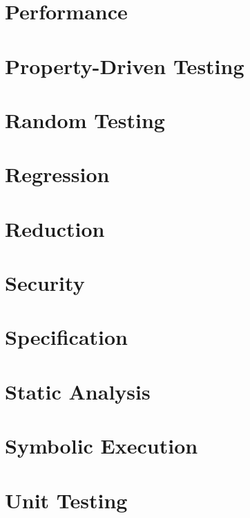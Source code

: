 \section{Performance}

\section{Property-Driven Testing}

\section{Random Testing}

\section{Regression}

\section{Reduction}

\section{Security}

\section{Specification}

\section{Static Analysis}

\section{Symbolic Execution}

\section{Unit Testing}
